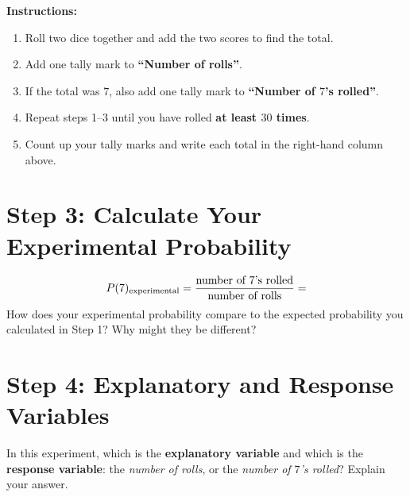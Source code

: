 \documentclass[11pt]{article}
\newcommand{\ans}{\hrulefill}
\newcommand{\anshere}{\par\vspace{0.4em}\noindent\ans\par\vspace{0.4em}}
\begin{document}
\vspace{0.4em}
\noindent\textbf{Instructions:}
\begin{enumerate}[label=\arabic*.]
  \item Roll two dice together and add the two scores to find the total.
  \item Add one tally mark to \textbf{``Number of rolls''}.
  \item If the total was $7$, also add one tally mark to \textbf{``Number of $7$'s rolled''}.
  \item Repeat steps 1--3 until you have rolled \textbf{at least $30$ times}.
  \item Count up your tally marks and write each total in the right-hand column above.
\end{enumerate}

\section{Step 3: Calculate Your Experimental Probability}
\[
  P(7)_{\text{experimental}} = \frac{\text{number of } 7\text{'s rolled}}{\text{number of
  rolls}} = \ans
\]
\noindent How does your experimental probability compare to the expected probability you
calculated in Step 1? Why might they be different?
\anshere
\anshere

\section{Step 4: Explanatory and Response Variables}
\noindent In this experiment, which is the \textbf{explanatory variable} and which is the
\textbf{response variable}: the \emph{number of rolls}, or the \emph{number of $7$'s rolled}?
Explain your answer.
\anshere
\anshere
\end{document}
